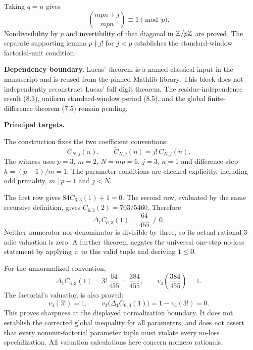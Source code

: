 Taking $q=n$ gives
\[
 \binom{mpn+j}{mpn}\equiv1\pmod p.
\]
Nondivisibility by $p$ and invertibility of that diagonal in $\mathbb Z/p\mathbb Z$ are proved. The separate supporting lemma $p\nmid j!$ for $j<p$ establishes the standard-window factorial-unit condition.

\textbf{Dependency boundary.} Lucas' theorem is a named classical input in the manuscript and is reused from the pinned Mathlib library. This block does not independently reconstruct Lucas' full digit theorem. The residue-independence result (8.3), uniform standard-window period (8.5), and the global finite-difference theorem (7.5) remain pending.

\textbf{Principal targets.}\par
{}\par
{}\par
{}\par
{}
\par\medskip
{}
The construction fixes the two coefficient conventions:
\[
 C_{N,j}(n),\qquad \widetilde C_{N,j}(n)=j!\,C_{N,j}(n).
\]
The witness uses $p=3$, $m=2$, $N=mp=6$, $j=3$, $n=1$ and difference step $h=(p-1)/m=1$. The parameter conditions are checked explicitly, including odd primality, $m\mid p-1$ and $j<N$.

The first row gives $84C_{6,3}(1)+1=0$. The second row, evaluated by the same recursive definition, gives $C_{6,3}(2)=703/5460$. Therefore
\[
 \Delta_1 C_{6,3}(1)=\frac{64}{455}\ne0.
\]
Neither numerator nor denominator is divisible by three, so its actual rational 3-adic valuation is zero. A further theorem negates the universal one-step no-loss statement by applying it to this valid tuple and deriving $1\le0$.

For the unnormalized convention,
\[
 \Delta_1\widetilde C_{6,3}(1)=3!\,\frac{64}{455}=\frac{384}{455},
 \qquad v_3\!\left(\frac{384}{455}\right)=1.
\]
The factorial's valuation is also proved:
\[
 v_3(3!)=1,\qquad
 v_3\bigl(\Delta_1C_{6,3}(1)\bigr)
 =1-v_3(3!)=0.
\]
This proves sharpness at the displayed normalization boundary. It does not establish the corrected global inequality for all parameters, and does not assert that every nonunit-factorial parameter tuple must violate every no-loss specialization. All valuation calculations here concern nonzero rationals.

